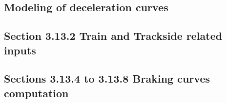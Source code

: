 \documentclass{template/openetcs_report}
\begin{document}
\subsection{Modeling of deceleration curves}





\subsection{Section 3.13.2 Train and Trackside related inputs}




\subsection{Sections 3.13.4 to 3.13.8 Braking curves computation}












\end{document}
